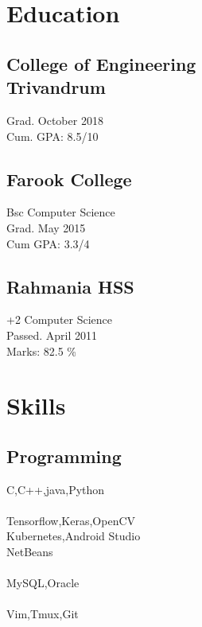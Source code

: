 \documentclass[11pt]{hieudo-build}
\begin{document}
\begin{minipage}[t]{0.34\textwidth} 

\section{Education} 
\subsection{College of Engineering \\ Trivandrum}                    
Grad. October 2018 \\                                               
Cum. GPA: 8.5/10\\                                                  
\sectionsep                                                         
\subsection{Farook College}  
Bsc Computer Science\\
Grad. May 2015 \\                                                   
Cum GPA: 3.3/4\\                                                    
\sectionsep     
\subsection{Rahmania HSS}
+2 Computer Science \\
Passed. April 2011 \\
Marks: 82.5 \%
\section{Skills}                                                    \subsection{Programming}                                          
C,C++,java,Python\\~\\
Tensorflow,Keras,OpenCV\\                                           
Kubernetes,Android Studio\\
NetBeans \\~\\
MySQL,Oracle \\~\\
Vim,Tmux,Git \\
 

\end{minipage}
\end{document}
